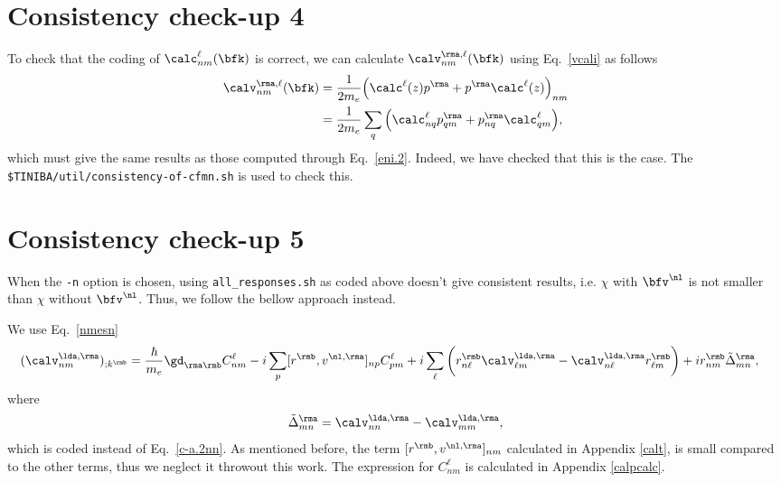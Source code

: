 \section{Consistency check-up 4}\label{ccu4}

To check that the coding of 
$\calc^\ell_{nm}(\bfk)$ 
is correct, we can calculate $\calv^{\rma,\ell}_{nm}(\bfk)$ using
Eq.~\eqref{vcali} as follows
\begin{align}\label{ccu.1}
\calv^{\rma,\ell}_{nm}(\bfk)
&=
\frac{1}{2m_e}
\Big(
\calc^\ell(z)p^\rma
+
p^\rma\calc^\ell(z)
\Big)_{nm}
\nonumber\\
&=
\frac{1}{2m_e}
\sum_q
\Big(
\calc^\ell_{nq}p^\rma_{qm}
+
p^\rma_{nq}\calc^\ell_{qm}
\Big)
,
\end{align}
which must give the same results as those computed through
Eq.~\eqref{eni.2}.
Indeed, we have checked that this is the case. The
\verb=$TINIBA/util/consistency-of-cfmn.sh=
is used to check this.

\section{Consistency check-up 5}\label{ccu5}

When the \verb=-n= option is chosen, using \verb=all_responses.sh= as
coded above doesn't give consistent results, i.e. $\chi$
 with $\bfv^\nl$  
is not smaller than $\chi$ 
 without $\bfv^\nl$. Thus, we follow the bellow approach instead.

We use Eq.~\eqref{nmesn}
\begin{align}\label{nmesnn}
(\calv^{\lda,\rma}_{nm})_{;k^{\rmb}}&=
\frac{\hbar}{m_e}\gd_{\rma\rmb}
C^\ell_{nm} 
-i 
\sum_p 
[r^{\rmb},v^{\nl,\rma}]_{np}C^\ell_{pm} 
+i 
\sum_{\ell}
\bigg(
r^{\rmb}_{n\ell}  
\calv^{\lda,\rma}_{\ell m}
-
\calv^{\lda,\rma}_{n\ell}   
r^{\rmb}_{\ell m}
\bigg)  
+i  
r^{\rmb}_{nm}
\tilde\Delta^{\rma}_{mn}
,
\end{align}  
where 
\begin{eqnarray}\label{tdeln}
\tilde\Delta^{\rma}_{mn}
=
\calv^{\lda,\rma}_{nn}  
-
\calv^{\lda,\rma}_{mm}  
, 
\end{eqnarray}
which is coded instead of Eq.~\eqref{c-a.2nn}. 
 As mentioned before, the term $[r^{\rmb},v^{\nl,\rma}]_{nm}$
calculated in Appendix \ref{calt}, is small 
compared to the other terms, thus we neglect it throwout this work.\cite{valerie} 
The expression for $C^\ell_{nm}$ is calculated in Appendix \ref{calpcalc}.

